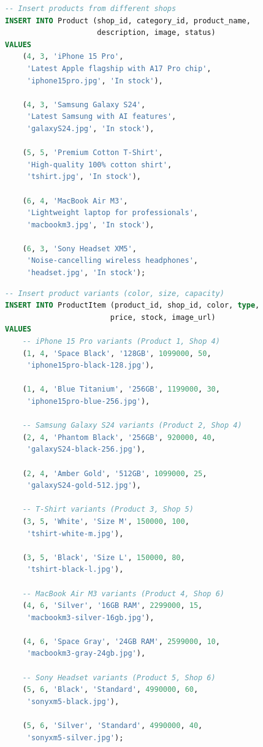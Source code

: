 \begin{lstlisting}[language=SQL, caption=Sample PRODUCT Insert, label=lst:insert_product]
-- Insert products from different shops
INSERT INTO Product (shop_id, category_id, product_name, 
                     description, image, status)
VALUES
    (4, 3, 'iPhone 15 Pro',
     'Latest Apple flagship with A17 Pro chip',
     'iphone15pro.jpg', 'In stock'),
    
    (4, 3, 'Samsung Galaxy S24',
     'Latest Samsung with AI features',
     'galaxyS24.jpg', 'In stock'),
    
    (5, 5, 'Premium Cotton T-Shirt',
     'High-quality 100% cotton shirt',
     'tshirt.jpg', 'In stock'),
    
    (6, 4, 'MacBook Air M3',
     'Lightweight laptop for professionals',
     'macbookm3.jpg', 'In stock'),
    
    (6, 3, 'Sony Headset XM5',
     'Noise-cancelling wireless headphones',
     'headset.jpg', 'In stock');
\end{lstlisting}

\begin{lstlisting}[language=SQL, caption=Sample PRODUCTITEM Insert, label=lst:insert_productitem]
-- Insert product variants (color, size, capacity)
INSERT INTO ProductItem (product_id, shop_id, color, type, 
                        price, stock, image_url)
VALUES
    -- iPhone 15 Pro variants (Product 1, Shop 4)
    (1, 4, 'Space Black', '128GB', 1099000, 50,
     'iphone15pro-black-128.jpg'),
    
    (1, 4, 'Blue Titanium', '256GB', 1199000, 30,
     'iphone15pro-blue-256.jpg'),
    
    -- Samsung Galaxy S24 variants (Product 2, Shop 4)
    (2, 4, 'Phantom Black', '256GB', 920000, 40,
     'galaxyS24-black-256.jpg'),
    
    (2, 4, 'Amber Gold', '512GB', 1099000, 25,
     'galaxyS24-gold-512.jpg'),
    
    -- T-Shirt variants (Product 3, Shop 5)
    (3, 5, 'White', 'Size M', 150000, 100,
     'tshirt-white-m.jpg'),
    
    (3, 5, 'Black', 'Size L', 150000, 80,
     'tshirt-black-l.jpg'),
    
    -- MacBook Air M3 variants (Product 4, Shop 6)
    (4, 6, 'Silver', '16GB RAM', 2299000, 15,
     'macbookm3-silver-16gb.jpg'),
    
    (4, 6, 'Space Gray', '24GB RAM', 2599000, 10,
     'macbookm3-gray-24gb.jpg'),
    
    -- Sony Headset variants (Product 5, Shop 6)
    (5, 6, 'Black', 'Standard', 4990000, 60,
     'sonyxm5-black.jpg'),
    
    (5, 6, 'Silver', 'Standard', 4990000, 40,
     'sonyxm5-silver.jpg');
\end{lstlisting}

